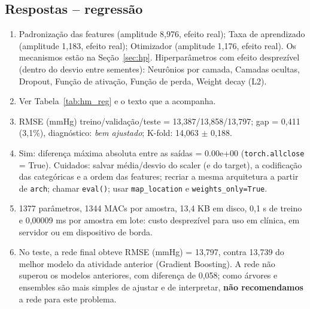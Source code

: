 \documentclass[11pt,a4paper]{article}
\begin{document}
\subsection{Respostas -- regressão}
\begin{enumerate}[label=(\alph*)]
\item Padronização das features (amplitude 8,976, efeito real); Taxa de aprendizado (amplitude 1,183, efeito real); Otimizador (amplitude 1,176, efeito real). Os mecanismos estão na Seção~\ref{sec:hp}. Hiperparâmetros com efeito desprezível (dentro do desvio entre sementes): Neurônios por camada, Camadas ocultas, Dropout, Função de ativação, Função de perda, Weight decay (L2). %
\item Ver Tabela~\ref{tab:hm_reg} e o texto que a acompanha.
\item RMSE (mmHg) treino/validação/teste = 13,387/13,858/13,797; gap = 0,411 (3,1\%), diagnóstico: \emph{bem ajustado}; K-fold: 14,063 $\pm$ 0,188.
\item Sim: diferença máxima absoluta entre as saídas = 0.00e+00 (\texttt{torch.allclose} = True). Cuidados: salvar média/desvio do scaler (e do target), a codificação das categóricas e a ordem das features; recriar a mesma arquitetura a partir de \texttt{arch}; chamar \texttt{eval()}; usar \texttt{map\_location} e \texttt{weights\_only=True}.
\item 1377 parâmetros, 1344 MACs por amostra, 13,4 KB em disco, 0,1 s de treino e 0,00009 ms por amostra em lote: custo desprezível para uso em clínica, em servidor ou em dispositivo de borda. %
\item No teste, a rede final obteve RMSE (mmHg) = 13,797, contra 13,739 do melhor modelo da atividade anterior (Gradient Boosting). A rede não superou os modelos anteriores, com diferença de 0,058; como árvores e ensembles são mais simples de ajustar e de interpretar, \textbf{não recomendamos} a rede para este problema. %
\end{enumerate}
\end{document}
